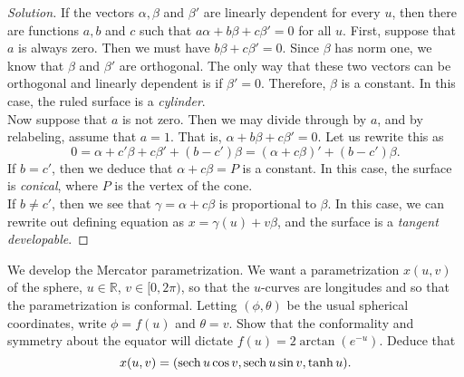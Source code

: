 \documentclass[Shifrin_Solutions_Spring_2018]{subfiles}
\begin{document}
\begin{proof}[Solution] If the vectors $\alpha, \beta$ and $\beta'$ are linearly dependent for every $u$, then there are functions $a, b$ and $c$ such that $a\alpha + b\beta + c\beta' =0$ for all $u$.
First, suppose that $a$ is always zero. Then we must have $b\beta+c\beta' = 0$. Since $\beta$ has norm one, we know that $\beta$ and $\beta'$ are orthogonal. The only way that these two vectors can be orthogonal and linearly dependent is if $\beta' = 0$. Therefore, $\beta$ is a constant. In this case, the ruled surface is a \emph{cylinder}.\\

Now suppose that $a$ is not zero. Then we may divide through by $a$, and by relabeling, assume that $a=1$. That is, $\alpha + b\beta +c\beta' = 0$. Let us rewrite this as
\[
0 = \alpha + c'\beta + c\beta' + (b-c')\beta = \left(\alpha + c\beta\right)' + (b-c')\beta.
\]
If $b=c'$, then we deduce that $\alpha+c\beta=P$ is a constant. In this case, the surface is \emph{conical}, where $P$ is the vertex of the cone. \\
If $b\neq c'$, then we see that $\gamma=\alpha+c\beta$ is proportional to $\beta$. In this case, we can rewrite out defining equation as $x = \gamma(u) + v \beta$, and the surface is a \emph{tangent developable}.
\end{proof}


\begin{exercise} We develop the Mercator parametrization. We want a parametrization $x(u,v)$ of the sphere, $u\in \mathbb{R}$, $v \in [0, 2\pi)$, so that the $u$-curves are longitudes and so that the parametrization is conformal. Letting $(\phi, \theta)$ be the usual spherical coordinates, write $\phi = f(u)$ and $\theta = v$. Show that the conformality and symmetry about the equator will dictate $f(u) = 2\arctan(e^{-u})$. Deduce that
\[
x(u,v) = ( \operatorname{\mathrm{sech}} u \cos v , \operatorname{\mathrm{sech}} u \sin v , \tanh u ) .
\]
\end{exercise}

\begin{exercise}

\end{exercise}

\begin{exercise}

\end{exercise}

\begin{exercise}

\end{exercise}

\begin{exercise}

\end{exercise}
\end{document}
